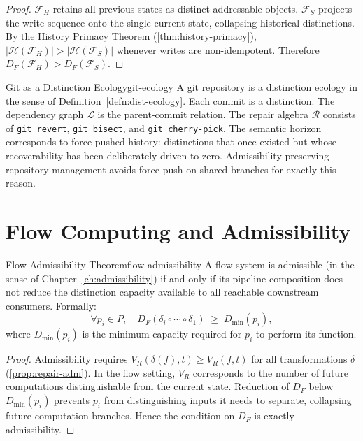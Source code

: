 \documentclass[12pt,twoside,openright]{book}
\newcommand{\csicon} {\marginpar{\tiny\color{DistBlue}\faCode}}
\newcommand{\hist}{\mathcal{H}}
\begin{document}
\begin{proof}
  $\mathcal{F}_H$ retains all previous states as distinct
  addressable objects.
  $\mathcal{F}_S$ projects the write sequence onto the
  single current state, collapsing historical distinctions.
  By the History Primacy Theorem
  (\cref{thm:history-primacy}),
  $|\hist(\mathcal{F}_H)| > |\hist(\mathcal{F}_S)|$
  whenever writes are non-idempotent.
  Therefore $D_F(\mathcal{F}_H) > D_F(\mathcal{F}_S)$.
\end{proof}

\begin{example}{Git as a Distinction Ecology}{git-ecology}
  \csicon
  A git repository is a distinction ecology in the sense
  of Definition~\ref{defn:dist-ecology}. Each commit is a
  distinction. The dependency graph $\mathcal{L}$ is the
  parent-commit relation. The repair algebra $\mathcal{R}$
  consists of \texttt{git revert}, \texttt{git bisect},
  and \texttt{git cherry-pick}. The semantic horizon
  corresponds to force-pushed history: distinctions that
  once existed but whose recoverability has been
  deliberately driven to zero. Admissibility-preserving
  repository management avoids force-push on shared
  branches for exactly this reason.
\end{example}

\section{Flow Computing and Admissibility}

\begin{theorem}{Flow Admissibility Theorem}{flow-admissibility}
  A flow system is admissible (in the sense of
  Chapter~\ref{ch:admissibility}) if and only if its
  pipeline composition does not reduce the distinction
  capacity available to all reachable downstream consumers.
  Formally:
  \[
    \forall p_i \in P,\quad
    D_F(\delta_i \circ \cdots \circ \delta_1)
    \;\ge\;
    D_{\min}(p_i),
  \]
  where $D_{\min}(p_i)$ is the minimum capacity
  required for $p_i$ to perform its function.
\end{theorem}

\begin{proof}
  Admissibility requires $V_R(\delta(f), t) \ge V_R(f, t)$
  for all transformations $\delta$
  (\cref{prop:repair-adm}).
  In the flow setting, $V_R$ corresponds to the number of
  future computations distinguishable from the current
  state. Reduction of $D_F$ below $D_{\min}(p_i)$
  prevents $p_i$ from distinguishing inputs it needs to
  separate, collapsing future computation branches.
  Hence the condition on $D_F$ is exactly admissibility.
\end{proof}
\end{document}
